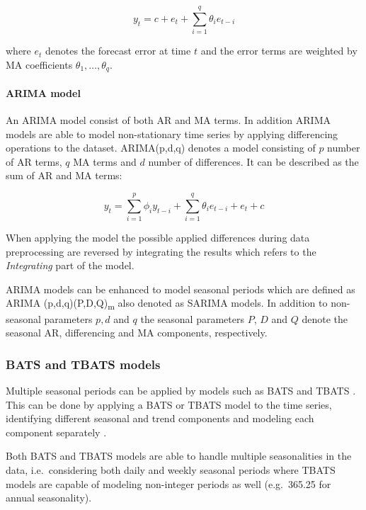 \begin{equation}
	y_t = c + e_t + \sum_{i=1}^q \theta_i e_{t-i}
\label{eq:ma_component}
\end{equation}

where $e_t$ denotes the forecast error at time $t$ and the error terms are weighted by MA coefficients $\theta_1,\ldots,\theta_q$.

\paragraph{ARIMA model} An ARIMA model consist of both AR and MA terms. In addition ARIMA models are able to model non-stationary time series by applying differencing operations to the dataset. ARIMA(p,d,q) denotes a model consisting of $p$ number of AR terms, $q$ MA terms and $d$ number of differences. 
It can be described as the sum of AR and MA terms:

\begin{equation}
	y_t = \sum_{i=1}^p \phi_i y_{t-i} + \sum_{i=1}^q \theta_i e_{t-i} + e_t + c
\label{eq:arima_model}
\end{equation}

When applying the model the possible applied differences during data preprocessing are reversed by integrating the results which refers to the \textit{Integrating} part of the model. 

ARIMA models can be enhanced to model seasonal periods which are defined as ARIMA (p,d,q)(P,D,Q)\textsubscript{m} also denoted as SARIMA models. 
In addition to non-seasonal parameters $p, d$ and $q$ the seasonal parameters $P$, $D$ and $Q$ denote the seasonal AR, differencing and MA components, respectively. 



\subsubsection{BATS and TBATS models}

Multiple seasonal periods can be applied by models such as BATS and TBATS \cite{r2016language}. This can be done by applying a BATS or TBATS model to the time series, identifying different seasonal and trend components and modeling each component separately \cite{de2011forecasting}. 

Both BATS and TBATS models are able to handle multiple seasonalities in the data, i.e.~considering both daily and weekly seasonal periods where TBATS models are capable of modeling non-integer periods as well (e.g.~365.25 for annual seasonality). 

